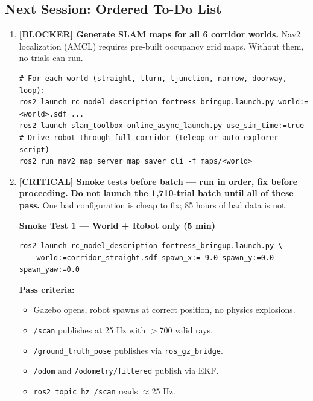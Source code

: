 \documentclass[11pt]{article}
\begin{document}
\subsection*{Next Session: Ordered To-Do List}

\begin{enumerate}
  \item \textbf{[BLOCKER] Generate SLAM maps for all 6 corridor worlds.}
    Nav2 localization (AMCL) requires pre-built occupancy grid maps. Without them,
    no trials can run.
    \begin{verbatim}
# For each world (straight, lturn, tjunction, narrow, doorway, loop):
ros2 launch rc_model_description fortress_bringup.launch.py world:=<world>.sdf ...
ros2 launch slam_toolbox online_async_launch.py use_sim_time:=true
# Drive robot through full corridor (teleop or auto-explorer script)
ros2 run nav2_map_server map_saver_cli -f maps/<world>
    \end{verbatim}

  \item \textbf{[CRITICAL] Smoke tests before batch --- run in order, fix before proceeding.}
    \textbf{Do not launch the 1,710-trial batch until all of these pass.}
    One bad configuration is cheap to fix; 85 hours of bad data is not.

    \textbf{Smoke Test 1 --- World + Robot only (5 min)}
    \begin{verbatim}
ros2 launch rc_model_description fortress_bringup.launch.py \
    world:=corridor_straight.sdf spawn_x:=-9.0 spawn_y:=0.0 spawn_yaw:=0.0
    \end{verbatim}
    \textbf{Pass criteria:}
    \begin{itemize}
      \item Gazebo opens, robot spawns at correct position, no physics explosions.
      \item \texttt{/scan} publishes at 25 Hz with $>$700 valid rays.
      \item \texttt{/ground\_truth\_pose} publishes via \texttt{ros\_gz\_bridge}.
      \item \texttt{/odom} and \texttt{/odometry/filtered} publish via EKF.
      \item \texttt{ros2 topic hz /scan} reads $\approx$25 Hz.
    \end{itemize}


\end{enumerate}
\end{document}
